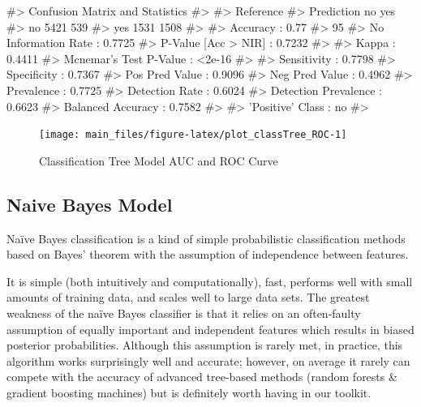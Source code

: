 \begin{Schunk}
\begin{Soutput}
#> Confusion Matrix and Statistics
#> 
#>           Reference
#> Prediction   no  yes
#>        no  5421  539
#>        yes 1531 1508
#>                                           
#>                Accuracy : 0.77            
#>                  95%
#>     No Information Rate : 0.7725          
#>     P-Value [Acc > NIR] : 0.7232          
#>                                           
#>                   Kappa : 0.4411          
#>  Mcnemar's Test P-Value : <2e-16          
#>                                           
#>             Sensitivity : 0.7798          
#>             Specificity : 0.7367          
#>          Pos Pred Value : 0.9096          
#>          Neg Pred Value : 0.4962          
#>              Prevalence : 0.7725          
#>          Detection Rate : 0.6024          
#>    Detection Prevalence : 0.6623          
#>       Balanced Accuracy : 0.7582          
#>                                           
#>        'Positive' Class : no              
#> 
\end{Soutput}
\end{Schunk}

\begin{Schunk}
\begin{figure}[H]

{\centering \texttt{[image: main\_files/figure-latex/plot\_classTree\_ROC-1]} 

}

\caption[Classification Tree Model AUC and ROC Curve]{Classification Tree Model AUC and ROC Curve}\label{fig:plot_classTree_ROC}
\end{figure}
\end{Schunk}

\hypertarget{naive-bayes-model}{%
\subsection{Naive Bayes Model}\label{naive-bayes-model}}

Naïve Bayes classification is a kind of simple probabilistic
classification methods based on Bayes' theorem with the assumption of
independence between features.

It is simple (both intuitively and computationally), fast, performs well
with small amounts of training data, and scales well to large data sets.
The greatest weakness of the naïve Bayes classifier is that it relies on
an often-faulty assumption of equally important and independent features
which results in biased posterior probabilities. Although this
assumption is rarely met, in practice, this algorithm works surprisingly
well and accurate; however, on average it rarely can compete with the
accuracy of advanced tree-based methods (random forests \& gradient
boosting machines) but is definitely worth having in our toolkit.

